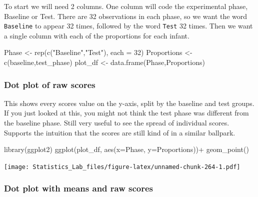 \documentclass[
]{book}
\newenvironment{Shaded}{\begin{snugshade}}{\end{snugshade}}
\newcommand{\AttributeTok}[1]{\textcolor[rgb]{0.77,0.63,0.00}{#1}}
\newcommand{\DecValTok}[1]{\textcolor[rgb]{0.00,0.00,0.81}{#1}}
\newcommand{\FunctionTok}[1]{\textcolor[rgb]{0.00,0.00,0.00}{#1}}
\newcommand{\NormalTok}[1]{#1}
\newcommand{\OtherTok}[1]{\textcolor[rgb]{0.56,0.35,0.01}{#1}}
\newcommand{\SpecialCharTok}[1]{\textcolor[rgb]{0.00,0.00,0.00}{#1}}
\newcommand{\StringTok}[1]{\textcolor[rgb]{0.31,0.60,0.02}{#1}}
\begin{document}
To start we will need 2 columns. One column will code the experimental phase, Baseline or Test. There are 32 observations in each phase, so we want the word \texttt{Baseline} to appear 32 times, followed by the word \texttt{Test} 32 times. Then we want a single column with each of the proportions for each infant.

\begin{Shaded}
\begin{Highlighting}[]
\NormalTok{Phase }\OtherTok{\textless{}{-}} \FunctionTok{rep}\NormalTok{(}\FunctionTok{c}\NormalTok{(}\StringTok{"Baseline"}\NormalTok{,}\StringTok{"Test"}\NormalTok{), }\AttributeTok{each =} \DecValTok{32}\NormalTok{)}
\NormalTok{Proportions }\OtherTok{\textless{}{-}} \FunctionTok{c}\NormalTok{(baseline,test\_phase)}
\NormalTok{plot\_df }\OtherTok{\textless{}{-}} \FunctionTok{data.frame}\NormalTok{(Phase,Proportions)}
\end{Highlighting}
\end{Shaded}

\hypertarget{dot-plot-of-raw-scores}{%
\subsubsection{Dot plot of raw scores}\label{dot-plot-of-raw-scores}}

This shows every scores value on the y-axis, split by the baseline and test groups. If you just looked at this, you might not think the test phase was different from the baseline phase. Still very useful to see the spread of individual scores. Supports the intuition that the scores are still kind of in a similar ballpark.

\begin{Shaded}
\begin{Highlighting}[]
\FunctionTok{library}\NormalTok{(ggplot2)}
\FunctionTok{ggplot}\NormalTok{(plot\_df, }\FunctionTok{aes}\NormalTok{(}\AttributeTok{x=}\NormalTok{Phase, }\AttributeTok{y=}\NormalTok{Proportions))}\SpecialCharTok{+}
  \FunctionTok{geom\_point}\NormalTok{()}
\end{Highlighting}
\end{Shaded}

\texttt{[image: Statistics\_Lab\_files/figure-latex/unnamed-chunk-264-1.pdf]}

\hypertarget{dot-plot-with-means-and-raw-scores}{%
\subsubsection{Dot plot with means and raw scores}\label{dot-plot-with-means-and-raw-scores}}
\end{document}
